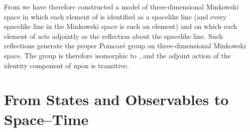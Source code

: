 \documentclass[a4paper,twoside,12pt]{article}
\def\Gs{{\cal G}}
\def\Ps{{\cal P}}
\begin{document}
     From \myHighlight{$(\mathfrak{G},\Gs)$}\coordHE{} we have therefore constructed a model
of three-dimensional Minkowski space in which each element of \myHighlight{$\Gs$}\coordHE{} is
identified as a spacelike line (and every spacelike line in the
Minkowski space is such an element) and on which each element of \myHighlight{$\Gs$}\coordHE{}
acts adjointly as the reflection about the spacelike line. Such
reflections generate the proper Poincar\'e group \myHighlight{$\Ps_+$}\coordHE{} on
three-dimensional Minkowski space. The group \coordHE{} is
therefore isomorphic to \myHighlight{$\Ps_+$}\coordHE{}, and the adjoint action of the identity
component of \coordHE{} upon \myHighlight{$\Gs$}\coordHE{} is transitive.

\section{From States and Observables to Space--Time}
\end{document}
